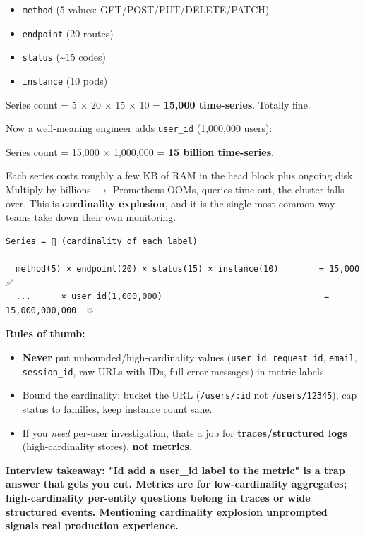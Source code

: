 \documentclass[11pt]{article}
\providecommand{\tightlist}{\setlength{\itemsep}{1pt}\setlength{\parskip}{0pt}}
\begin{document}
\begin{itemize}
\tightlist
\item
  \texttt{method} (5 values: GET/POST/PUT/DELETE/PATCH)
\item
  \texttt{endpoint} (20 routes)
\item
  \texttt{status} (\textasciitilde15 codes)
\item
  \texttt{instance} (10 pods)
\end{itemize}

Series count = 5 \(\times\) 20 \(\times\) 15 \(\times\) 10 = \textbf{15,000 time-series}. Totally fine.

Now a well-meaning engineer adds \texttt{user\_id} (1,000,000 users):

Series count = 15,000 \(\times\) 1,000,000 = \textbf{15 billion time-series}.

Each series costs roughly a few KB of RAM in the head block plus ongoing disk. Multiply by billions \(\rightarrow\) Prometheus OOMs, queries time out, the cluster falls over. This is \textbf{cardinality explosion}, and it is the single most common way teams take down their own monitoring.

\setcodelang{}

\begin{verbatim}
Series = ∏ (cardinality of each label)

  method(5) × endpoint(20) × status(15) × instance(10)        = 15,000      ✅
  ...      × user_id(1,000,000)                                = 15,000,000,000  💥
\end{verbatim}

\textbf{Rules of thumb:}

\begin{itemize}
\tightlist
\item
  \textbf{Never} put unbounded/high-cardinality values (\texttt{user\_id}, \texttt{request\_id}, \texttt{email}, \texttt{session\_id}, raw URLs with IDs, full error messages) in metric labels.
\item
  Bound the cardinality: bucket the URL (\texttt{/users/:id} not \texttt{/users/12345}), cap status to families, keep instance count sane.
\item
  If you \emph{need} per-user investigation, that\textquotesingle s a job for \textbf{traces/structured logs} (high-cardinality stores), \textbf{not metrics}.
\end{itemize}

\textbf{Interview takeaway: "I\textquotesingle d add a user\_id label to the metric" is a trap answer that gets you cut. Metrics are for low-cardinality aggregates; high-cardinality per-entity questions belong in traces or wide structured events. Mentioning cardinality explosion unprompted signals real production experience.}
\end{document}

